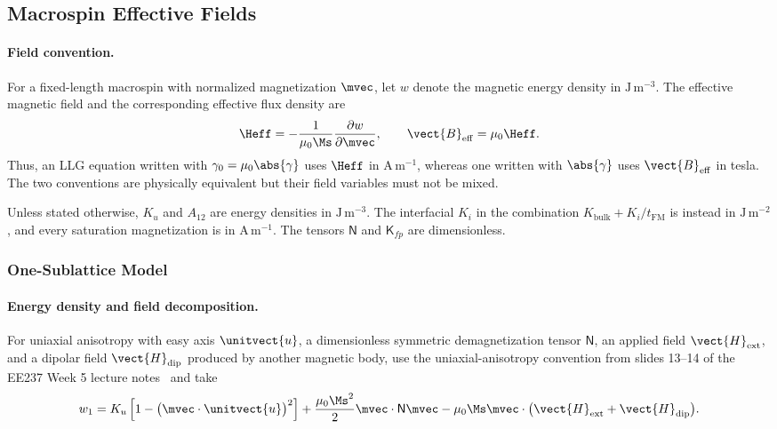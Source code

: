 \subsection{Macrospin Effective Fields}

\paragraph{Field convention.}
For a fixed-length macrospin with normalized magnetization $\mvec$, let $w$
denote the magnetic energy density in $\mathrm{J\,m^{-3}}$.  The effective
magnetic field and the corresponding effective flux density are~\cite{ee237-week5}
\begin{equation}
    \Heff
    =-\frac{1}{\mu_0\Ms}\frac{\partial w}{\partial\mvec},
    \qquad
    \vect{B}_{\mathrm{eff}}=\mu_0\Heff.
    \label{eq:macrospin-effective-field}
\end{equation}
Thus, an LLG equation written with $\gamma_0=\mu_0\abs{\gamma}$ uses
$\Heff$ in $\mathrm{A\,m^{-1}}$, whereas one written with
$\abs{\gamma}$ uses $\vect{B}_{\mathrm{eff}}$ in tesla.  The two
conventions are physically equivalent but their field variables must not be
mixed.

Unless stated otherwise, $K_u$ and $A_{12}$ are energy densities in
$\mathrm{J\,m^{-3}}$.  The interfacial $K_i$ in the combination
$K_{\mathrm{bulk}}+K_i/t_{\mathrm{FM}}$ is instead in
$\mathrm{J\,m^{-2}}$, and every saturation magnetization is in
$\mathrm{A\,m^{-1}}$.  The tensors $\mathsf{N}$ and $\mathsf{K}_{fp}$ are
dimensionless.

\subsubsection{One-Sublattice Model}

\paragraph{Energy density and field decomposition.}
For uniaxial anisotropy with easy axis $\unitvect{u}$, a dimensionless
symmetric demagnetization tensor $\mathsf{N}$, an applied field
$\vect{H}_{\mathrm{ext}}$, and a dipolar field $\vect{H}_{\mathrm{dip}}$
produced by another magnetic body, use the uniaxial-anisotropy convention
from slides 13--14 of the EE237 Week 5 lecture notes~\cite{ee237-week5} and
take
\begin{equation}
    w_1
    =K_u\left[1-\bigl(\mvec\cdot\unitvect{u}\bigr)^2\right]
    +\frac{\mu_0\Ms^2}{2}\mvec\cdot\mathsf{N}\mvec
    -\mu_0\Ms\mvec\cdot
    \bigl(\vect{H}_{\mathrm{ext}}+\vect{H}_{\mathrm{dip}}\bigr).
    \label{eq:one-sublattice-energy}
\end{equation}

